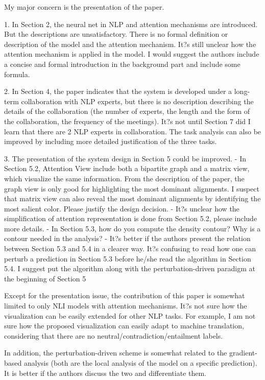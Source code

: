 My major concern is the presentation of the paper.

1. In Section 2, the neural net in NLP and attention mechanisms are introduced. But the descriptions are unsatisfactory. There is no formal definition or description of the model and the attention mechanism. It?s still unclear how the attention mechanism is applied in the model. I would suggest the authors include a concise and formal introduction in the background part and include some formula.

2. In Section 4, the paper indicates that the system is developed under a long-term collaboration with NLP experts, but there is no description describing the details of the collaboration (the number of experts, the length and the form of the collaboration, the frequency of the meetings). It?s not until Section 7 did I learn that there are 2 NLP experts in collaboration. The task analysis can also be improved by including more detailed justification of the three tasks.

3. The presentation of the system design in Section 5 could be improved. 
- In Section 5.2, Attention View include both a bipartite graph and a matrix view, which visualize the same information. From the description of the paper, the graph view is only good for highlighting the most dominant alignments. I suspect that matrix view can also reveal the most dominant alignments by identifying the most salient color. Please justify the design decision. 
- It?s unclear how the simplification of attention representation is done from Section 5.2, please include more details.
- In Section 5.3, how do you compute the density contour? Why is a contour needed in the analysis?
- It?s better if the authors present the relation between Section 5.3 and 5.4 in a clearer way. It?s confusing to read how one can perturb a prediction in Section 5.3 before he/she read the algorithm in Section 5.4. I suggest put the algorithm along with the perturbation-driven paradigm at the beginning of Section 5

Except for the presentation issue, the contribution of this paper is somewhat limited to only NLI models with attention mechanisms. It?s not sure how the visualization can be easily extended for other NLP tasks. For example, I am not sure how the proposed visualization can easily adapt to machine translation, considering that there are no neutral/contradiction/entailment labels.

In addition, the perturbation-driven scheme is somewhat related to the gradient-based analysis (both are the local analysis of the model on a specific prediction). It is better if the authors discuss the two and differentiate them.

